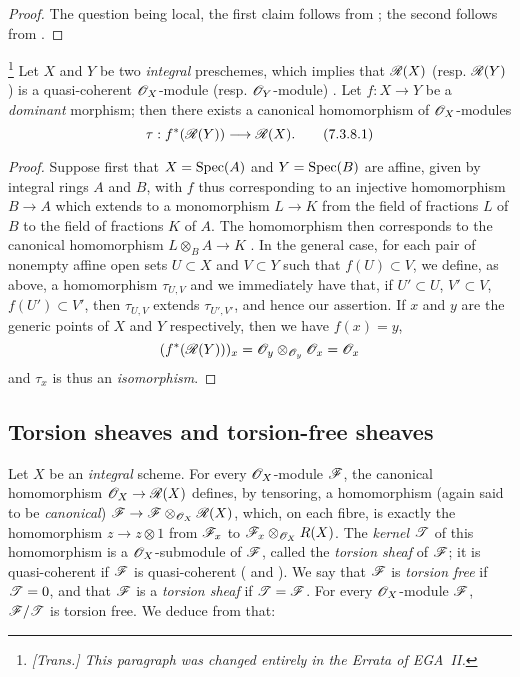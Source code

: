 \begin{proof}
\label{proof-I.7.3.7}
The question being local, the first claim follows from ; the second follows from .
\end{proof}

\begin{env}[7.3.8]
\label{I.7.3.8}
\footnote{\emph{[Trans.] This paragraph was changed entirely in the Errata of EGA~II.}}
Let $X$ and $Y$ be two \emph{integral} preschemes, which implies that $\mathscr{R}(X)$ (resp. $\mathscr{R}(Y)$) is a quasi-coherent $\mathscr{O}_X$-module (resp. $\mathscr{O}_Y$-module) .
Let $f:X\to Y$ be a \emph{dominant} morphism; then there exists a canonical homomorphism of $\mathscr{O}_X$-modules
\[
\label{I.7.3.8.1}
  \tau:f^*(\sh{R}(Y))\to\sh{R}(X).
  \tag{7.3.8.1}
\]
\end{env}

\begin{proof}
\label{proof-I.7.3.8}
Suppose first that $X=\operatorname{Spec}(A)$ and $Y=\operatorname{Spec}(B)$ are affine, given by integral rings $A$ and $B$, with $f$ thus corresponding to an injective homomorphism $B\to A$ which extends to a monomorphism $L\to K$ from the field of fractions $L$ of $B$ to the field of fractions $K$ of $A$.
The homomorphism  then corresponds to the canonical homomorphism $L\otimes_B A\to K$ .
In the general case, for each pair of nonempty affine open sets $U\subset X$ and $V\subset Y$ such that $f(U)\subset V$, we define, as above, a homomorphism $\tau_{U,V}$ and we immediately have that, if $U'\subset U$, $V'\subset V$, $f(U')\subset V'$, then $\tau_{U,V}$ extends $\tau_{U',V'}$, and hence our assertion.
If $x$ and $y$ are the generic points of $X$ and $Y$ respectively, then we have $f(x)=y$,
\[
  (f^*(\mathscr{R}(Y)))_x=\mathscr{O}_y\otimes_{\mathscr{O}_y}\mathscr{O}_x=\mathscr{O}_x
\]
 and $\tau_x$ is thus an \emph{isomorphism}.
\end{proof}

\subsection{Torsion sheaves and torsion-free sheaves}
\label{subsection:I.7.4}

\begin{env}[7.4.1]
\label{I.7.4.1}
Let $X$ be an \emph{integral} scheme.
For every $\mathscr{O}_X$-module $\mathscr{F}$, the canonical homomorphism $\sh{O}_X\to\sh{R}(X)$ defines, by tensoring, a homomorphism (again said to be \emph{canonical}) $\sh{F}\to\sh{F}\otimes_{\sh{O}_X}\sh{R}(X)$, which, on each fibre, is exactly the homomorphism $z\to z\otimes1$ from $\mathscr{F}_x$ to $\mathscr{F}_x\otimes_{\mathscr{O}_X}R(X)$.
The \emph{kernel $\mathscr{T}$} of this homomorphism is a $\mathscr{O}_X$-submodule of $\mathscr{F}$, called the \emph{torsion sheaf} of $\mathscr{F}$; it is quasi-coherent if $\mathscr{F}$ is quasi-coherent ( and ).
We say that $\mathscr{F}$ is \emph{torsion free} if $\mathscr{T}=0$, and that $\mathscr{F}$ is a \emph{torsion sheaf} if $\mathscr{T}=\mathscr{F}$.
For every $\mathscr{O}_X$-module $\mathscr{F}$, $\mathscr{F}/\mathscr{T}$ is torsion free.
We deduce from  that:
\end{env}

